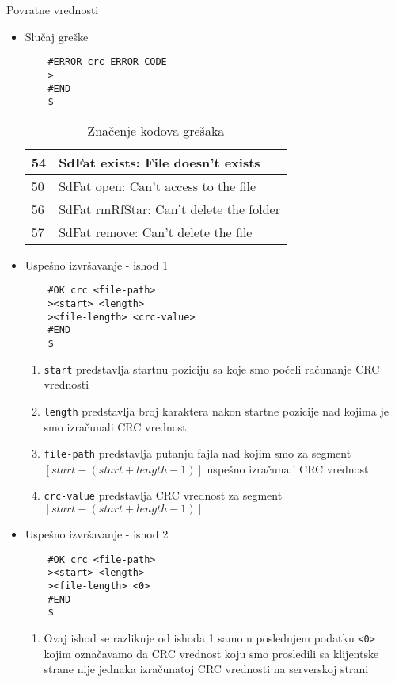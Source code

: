 \documentclass[a4paper]{extarticle}
\begin{document}
Povratne vrednosti
\begin{itemize}
	\item Slučaj greške\\
	\begin{verbatim}
	#ERROR crc ERROR_CODE
	>
	#END
	$
	\end{verbatim}
	
	\begin{table}[h]
		\centering
		\begin{tabular}{|l|l|}
			\hline
			54 & SdFat exists: File doesn't exists       \\ \hline
			50 & SdFat open: Can't access to the file    \\ \hline
			56 & SdFat rmRfStar: Can't delete the folder \\ \hline
			57 & SdFat remove: Can't delete the file     \\ \hline
		\end{tabular}
		\caption{Značenje kodova grešaka}
		\label{tab:my-table}
	\end{table}
	\item Uspešno izvršavanje - ishod 1\\
	\begin{verbatim}
	#OK crc <file-path>
	><start> <length>
	><file-length> <crc-value>
	#END
	$
	\end{verbatim}
	\begin{enumerate}
		\item \verb|start| predstavlja startnu poziciju sa koje smo počeli računanje CRC vrednosti
		\item \verb|length| predstavlja broj karaktera nakon startne pozicije nad kojima je smo izračunali CRC vrednost
		\item \verb|file-path| predstavlja putanju fajla nad kojim smo za segment $[start-(start+length-1)]$ uspešno izračunali CRC vrednost
		\item \verb|crc-value| predstavlja CRC vrednost za segment $[start-(start+length-1)]$
	\end{enumerate}
	
	\item Uspešno izvršavanje - ishod 2\\
	\begin{verbatim}
	#OK crc <file-path>
	><start> <length>
	><file-length> <0>
	#END
	$
	\end{verbatim}
	\begin{enumerate}
		\item Ovaj ishod se razlikuje od ishoda 1 samo u poslednjem podatku \verb|<0>| kojim označavamo da CRC vrednost koju smo prosledili sa klijentske strane nije jednaka izračunatoj CRC vrednosti na serverskoj strani
	\end{enumerate}
	

\end{itemize}
\end{document}
